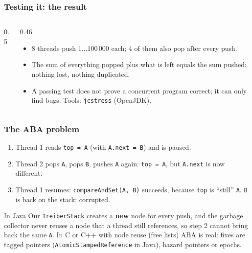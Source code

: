\documentclass[aspectratio=169,10pt,compress]{beamer}
\begin{document}
\begin{frame}[t,fragile] \frametitle{Testing it: the result}
  \begin{columns}[T]
    \begin{column}{0.5\textwidth}
    \end{column}
    \begin{column}{0.46\textwidth}
      \begin{itemize}\small
        \item 8 threads push $1 \dots 100\,000$ each; 4 of them also pop after every push.
        \item The sum of everything popped plus what is left equals the sum pushed: nothing lost, nothing duplicated.
        \item A passing test does not prove a concurrent program correct; it can only find bugs. Tools: \texttt{jcstress} (OpenJDK).
      \end{itemize}
    \end{column}
  \end{columns}
\end{frame}




\begin{frame}[t,fragile] \frametitle{The ABA problem}
  \begin{enumerate}\small
    \item Thread 1 reads \texttt{top = A} (with \texttt{A.next = B}) and is paused.
    \item Thread 2 pops \texttt{A}, pops \texttt{B}, pushes \texttt{A} again: \texttt{top = A}, but \texttt{A.next} is now different.
    \item Thread 1 resumes: \texttt{compareAndSet(A, B)} succeeds, because \texttt{top} is ``still'' \texttt{A}. \texttt{B} is back on the stack: corrupted.
  \end{enumerate}
  \begin{block}{In Java}
    \small Our \texttt{TreiberStack} creates a \textbf{new} node for every push, and the garbage collector never reuses a node that a thread
    still references, so step 2 cannot bring back the same \texttt{A}. In C or C++ with node reuse (free lists) ABA is real: fixes are
    tagged pointers (\texttt{AtomicStampedReference} in Java), hazard pointers or epochs.
  \end{block}
\end{frame}
\end{document}
